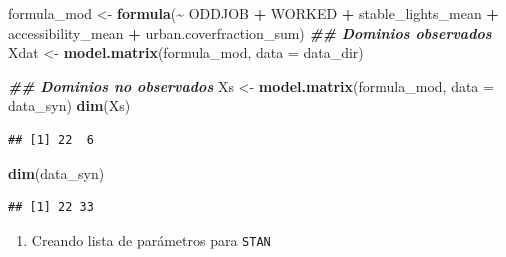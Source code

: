 \documentclass[
  12pt,
]{book}
\newenvironment{Shaded}{\begin{snugshade}}{\end{snugshade}}
\newcommand{\AttributeTok}[1]{\textcolor[rgb]{0.13,0.29,0.53}{#1}}
\newcommand{\CommentTok}[1]{\textcolor[rgb]{0.56,0.35,0.01}{\textit{#1}}}
\newcommand{\DocumentationTok}[1]{\textcolor[rgb]{0.56,0.35,0.01}{\textbf{\textit{#1}}}}
\newcommand{\FunctionTok}[1]{\textcolor[rgb]{0.13,0.29,0.53}{\textbf{#1}}}
\newcommand{\NormalTok}[1]{#1}
\newcommand{\OtherTok}[1]{\textcolor[rgb]{0.56,0.35,0.01}{#1}}
\newcommand{\SpecialCharTok}[1]{\textcolor[rgb]{0.81,0.36,0.00}{\textbf{#1}}}
\providecommand{\tightlist}{%
  \setlength{\itemsep}{0pt}\setlength{\parskip}{0pt}}
\begin{document}
\begin{Shaded}
\begin{Highlighting}[]
\NormalTok{formula\_mod  }\OtherTok{\textless{}{-}} \FunctionTok{formula}\NormalTok{(}\SpecialCharTok{\textasciitilde{}}\NormalTok{  ODDJOB }\SpecialCharTok{+}\NormalTok{ WORKED }\SpecialCharTok{+}
\NormalTok{                         stable\_lights\_mean }\SpecialCharTok{+} 
\NormalTok{                         accessibility\_mean }\SpecialCharTok{+} 
\NormalTok{                         urban.coverfraction\_sum)}
\DocumentationTok{\#\# Dominios observados}
\NormalTok{Xdat }\OtherTok{\textless{}{-}} \FunctionTok{model.matrix}\NormalTok{(formula\_mod, }\AttributeTok{data =}\NormalTok{ data\_dir)}

\DocumentationTok{\#\# Dominios no observados}
\NormalTok{Xs }\OtherTok{\textless{}{-}} \FunctionTok{model.matrix}\NormalTok{(formula\_mod, }\AttributeTok{data =}\NormalTok{ data\_syn)}
\FunctionTok{dim}\NormalTok{(Xs)}
\end{Highlighting}
\end{Shaded}

\begin{verbatim}
## [1] 22  6
\end{verbatim}

\begin{Shaded}
\begin{Highlighting}[]
\FunctionTok{dim}\NormalTok{(data\_syn)}
\end{Highlighting}
\end{Shaded}

\begin{verbatim}
## [1] 22 33
\end{verbatim}

\begin{enumerate}
\def\labelenumi{\arabic{enumi}.}
\setcounter{enumi}{2}
\tightlist
\item
  Creando lista de parámetros para \texttt{STAN}
\end{enumerate}

\begin{Shaded}
\end{Shaded}
\end{document}
